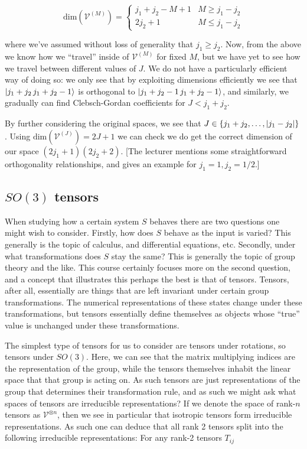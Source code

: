 \documentclass{article}
\theoremstyle{definition}
\begin{document}
$$ \text{dim}(\mathcal{V}^{(M)}) = 
\begin{cases}
j_1 + j_2 - M + 1 & M \geq j_1 - j_2 \\
2j_2 + 1 & M \leq j_1 - j_2
\end{cases}
$$

where we've assumed without loss of generality that $j_1 \geq j_2$. Now, from
the above we know how we ``travel'' inside of $\mathcal{V}^{(M)}$ for fixed $M$,
but we have yet to see how we travel between different values of $J$. We do not
have a particularly efficient way of doing so: we only see that by exploiting
dimensions efficiently we see that $\ket{j_1 + j_2 \, j_1 + j_2 - 1}$ is
orthogonal to $\ket{j_1 + j_2 - 1 \, j_1 + j_2 - 1}$, and similarly, we
gradually can find Clebsch-Gordan coefficients for $J < j_1 + j_2$.

By further considering the original spaces, we see that $J \in \{j_1 + j_2,
\dots, \abs{j_1 - j_2}\}$. Using $\text{dim}(\mathcal{V}^{(J)}) = 2J + 1$ we
can check we do get the correct dimension of our space $(2j_1 + 1)(2j_2 + 2)$.
[The lecturer mentions some straightforward orthogonality relationships, and
gives an example for $j_1 = 1, j_2 = 1/2$.]

\subsection{$SO(3)$ tensors}

When studying how a certain system $S$ behaves there are two questions one might
wish to consider. Firstly, how does $S$ behave as the input is varied? This
generally is the topic of calculus, and differential equations, etc. Secondly,
under what transformations does $S$ stay the same? This is generally the topic
of group theory and the like. This course certainly focuses more on the second
question, and a concept that illustrates this perhaps the best is that of
tensors. Tensors, after all, essentially are things that are left invariant
under certain group transformations. The numerical representations of these
states change under these transformations, but tensors essentially define
themselves as objects whose ``true'' value is unchanged under these
transformations.

The simplest type of tensors for us to consider are tensors under rotations, so
tensors under $SO(3)$. Here, we can see that the matrix multiplying indices are
the representation of the group, while the tensors themselves inhabit the linear
space that that group is acting on. As such tensors are just representations of
the group that determines their transformation rule, and as such we might ask
what spaces of tensors are irreducible representations? If we denote the space
of rank-$n$ tensors as $\mathcal{V}^{\otimes n}$, then we see in particular that
isotropic tensors form irreducible representations. As such one can deduce that
all rank 2 tensors split into the following irreducible representations: For any
rank-2 tensors $T_{ij}$
\end{document}
